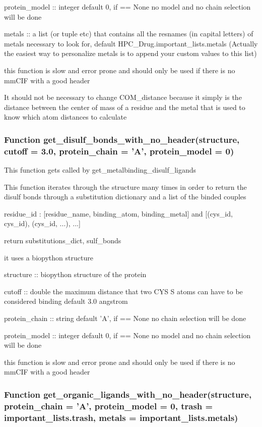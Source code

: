         protein\_model :: integer default 0, if == None no model and no chain selection will be done

        metals :: a list (or tuple etc) that contains all the resnames (in capital letters) of metals necessary to look for, default HPC\_Drug.important\_lists.metals (Actually the easiest way to personalize metals is to append your custom values to this list)


        this function is slow and error prone and should only be used if there is no mmCIF with a good header

        It should not be necessary to change COM\_distance because it simply is the distance between the center of mass of a residue and the metal that is used to know which atom distances to calculate

    \subsubsection{Function get\_disulf\_bonds\_with\_no\_header(structure, cutoff = 3.0, protein\_chain = 'A', protein\_model = 0)}

        This function gets called by get\_metalbinding\_disulf\_ligands

        This function iterates through the structure many times in order to return the disulf bonds through a substitution dictionary and a list of the binded couples

        {residue\_id : [residue\_name, binding\_atom, binding\_metal]} and [(cys\_id, cys\_id), (cys\_id, ...), ...]

        return substitutions\_dict, sulf\_bonds

        it uses a biopython structure

        structure :: biopython structure of the protein

        cutoff :: double the maximum distance that two CYS S atoms can have to be considered binding default 3.0 angstrom

        protein\_chain :: string default 'A', if == None no chain selection will be done

        protein\_model :: integer default 0, if == None no model and no chain selection will be done

        this function is slow and error prone and should only be used if there is no mmCIF with a good header


    \subsubsection{Function get\_organic\_ligands\_with\_no\_header(structure, protein\_chain = 'A', protein\_model = 0, trash = important\_lists.trash, metals = important\_lists.metals)}

